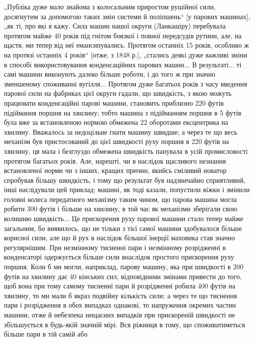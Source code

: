 „Публіка дуже мало знайома з колосальним приростом рушійної сили, досягнутим за допомогою таких змін
системи й поліпшень“ [у парових машинах], „як ті, про які я кажу. Сила машин нашої округи
(Ланкашіру) перебувала протягом майже 40 років
під гнітом боязкої і повної передсудів рутини, але, на щастя,
ми тепер від неї емансипувались. Протягом останніх 15 років,
особливо ж на протязі останніх 4 років“ [отже, з 1848 р.], „стались деякі дуже важливі зміни в
способі використовування конденсаційних парових машин... В результаті... ті самі машини виконують
далеко більше роботи, і до того ж при значно зменшеному споживанні вугілля... Протягом дуже багатьох
років
з часу введення парової сили на фабриках цієї округи гадали,
що швидкість, з якою можуть працювати конденсаційні парові
машини, становить приблизно 220 футів підіймання поршня на
хвилину; тобто машина з підійманням поршня в 5 футів була вже
за встановленою нормою обмежена 22 оборотами ексцентрика на
хвилину. Вважалось за недоцільне гнати машину швидше; а через
те що весь механізм був пристосований до цієї швидкості руху
поршня в 220 футів на хвилину, ця мала і безглуздо обмежена
швидкість панувала в усій промисловості протягом багатьох років.
Але, нарешті, чи в наслідок щасливого незнання встановленої норми
чи з інших, кращих причин, якийсь сміливий новатор спробував
більшу швидкість, і тому що результат був надзвичайно сприятливий, інші наслідували цей приклад;
машині, як тоді казали, попустили віжки і змінили головні колеса передатного механізму таким
чином, що парова машина могла робити 300 футів і більше на
хвилину, в той час як механізми зберігали свою колишню швидкість... Це прискорення руху парової
машини стало тепер майже
загальним, бо виявилось, що не тільки з тієї самої машини здобувалося більше корисної сили, але що й
рух в наслідок більшої
інерції маховика став значно регулярнішим. При незмінному
тисненні пари і незмінному розрідженні в конденсаторі одержується більше сили внаслідок простого
прискорення руху
поршня. Коли б ми могли, наприклад, парову машину, яка при
швидкості в 200 футів на хвилину дає 40 кінських сил, відповідними змінами привести до того, щоб
вона при тому самому тисненні
пари й розрідженні робила 400 футів на хвилину, то ми мали б
якраз подвійну кількість сили; а через те що тиснення пари
і розрідження в обох випадках однакові, то напруження окремих
частин машини, отже й небезпека нещасних випадків при прискореній швидкості не збільшується в
будь-якій значній мірі. Вся ріжниця в тому, що споживатиметься більше пари в тій самій або
